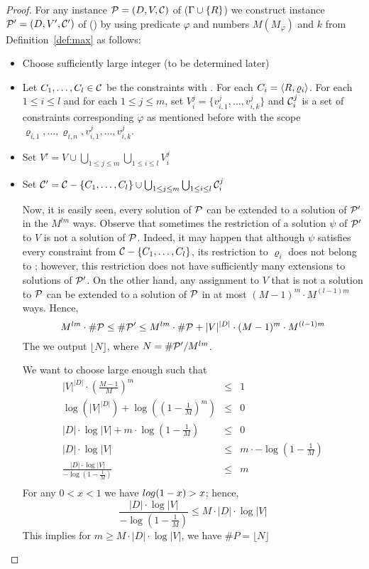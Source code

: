 \begin{proof}
For any instance \(\mathcal{P} = (D,V,\mathcal{C})\) of  \ccsp(\(\Gamma \cup \{{R}\}\)) we
construct instance \(\mathcal{P}' = (D, V',\mathcal{C}')\) of  \ccsp(\mrelset) by using 
predicate \(\varphi\) and numbers \(M(M_\varphi)\) and \(k\) from Definition~\ref{def:max} as follows:
\begin{itemize}
\item 
Choose sufficiently large integer \mm(to be determined later)
\item
Let \(C_1,\dotsc,C_l\in\mathcal{C}\) be the constraints with \mR\@. For each
\(C_i=\langle R,\varrho_i \rangle\)\@. For each \(1\le i \le l\) and for each \(1\le j\le m\), set
\(V^j_i = \{v^j_{i,1},\dotsc,v^j_{i,k}\}\) and \(\mathcal{C}^j_i\) is a set of constraints
corresponding \(\varphi\) as mentioned before with the scope \(\varrho_{i,1},\dotsc,\varrho_{i,n},
v^j_{i,1},\dotsc,v^j_{i,k}\)\@.
\item Set \(V'=V \cup \bigcup_{1\le j \le m} \bigcup_{1\le i\le l} V^j_i\)
\item Set \(\mathcal{C}' = \mathcal{C} - \{{C_1,\dotsc,C_l}\} \cup 
\bigcup_{1\le j \le m} \bigcup_{1\le i\le l} \mathcal{C}^j_i\)

Now, it is easily seen, every solution of \(\mathcal{P}\) can be extended to a solution of \(\mathcal{P}'\)
in the \(M^{lm}\) ways. Observe that sometimes the restriction of a solution \(\psi\)
of \(\mathcal{P}'\) to \(V\) is not a solution of \(\mathcal{P}\)\@. Indeed, it may happen that
although \(\psi\) satisfies every constraint from \(\mathcal{C} - \{{C_1,\dotsc,C_l}\}\),
its restriction to \(\varrho_i\) does not belong to \mR; however, this restriction does not have
sufficiently many extensions to solutions of \(\mathcal{P}'\)\@.
On the other hand, any assignment to \(V\) that is not a solution to
\(\mathcal{P}\) can be extended to a solution of \(\mathcal{P}\) in at most \((M-1)^m\cdot M^{(l-1)m}\)
ways. Hence, 
\[M^{lm}\cdot \#\mathcal{P} \le  \#\mathcal{P}'  
 \le  M^{lm} \cdot \#\mathcal{P} + |V|^{|D|} \cdot (M-1)^{m} \cdot M ^{(l-1)m}
 \]
The we output \(\lfloor N \rfloor\), where \(N=\#\mathcal{P}'/M^{lm}\)\@.

We want to choose large enough such that
\begin{eqnarray*}
|V|^{|D|} \cdot \left(\frac{M-1}{M}\right)^{m} & \le & 1 \\
\log (|V|^{|D|}) + \log\left( \left(1-\frac{1}{M}\right)^{m} \right) & \le &  0 \\
|D| \cdot \log |V| + m \cdot \log \left(1-\frac{1}{M}\right) & \le & 0 \\ 
|D| \cdot \log |V| & \le & m \cdot -\log \left(1-\frac{1}{M}\right) \\ 
\frac{|D| \cdot \log |V|}{-\log \left(1-\frac{1}{M}\right)} & \le & m \\
\end{eqnarray*}
For any \(0<x<1\) we have \(\-log (1-x) > x \); hence, 
\[
\frac{|D| \cdot \log |V|}{-\log \left(1-\frac{1}{M}\right)} \le 
M \cdot |D| \cdot \log |V|
\]
This implies for \(m \ge M \cdot |D| \cdot \log |V|\), we have 
\(\#P=\lfloor N \rfloor\)

\end{itemize}
\end{proof}

